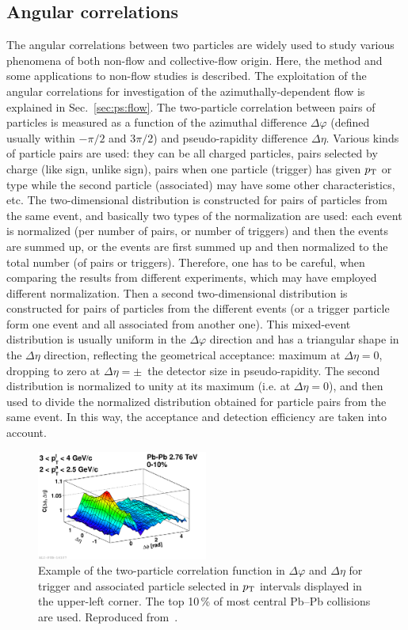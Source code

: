 \subsection{Angular correlations}
\label{subsecks:angular}
The angular correlations between two particles are widely used to study various phenomena of both non-flow and collective-flow origin. Here, the method and some applications to non-flow studies is described. The exploitation of the angular correlations for investigation of the azimuthally-dependent flow is explained in Sec.~\ref{sec:ps:flow}. The two-particle correlation between pairs of particles is measured as a function of the azimuthal difference $\Delta\varphi$ (defined usually within $−\pi/2$ and $3\pi/2$) and pseudo-rapidity difference $\Delta\eta$. Various kinds of particle pairs are used: they can be all charged particles, pairs selected by charge (like sign, unlike sign), pairs when one particle (trigger) has given $p_{\rm T}$ or type while the second particle (associated) may have some other characteristics, etc. The two-dimensional distribution is constructed for pairs of particles from the same event, and basically two types of the normalization are used: each event is normalized (per number of pairs, or number of triggers) and then the events are summed up, or the events are first summed up and then normalized to the total number (of pairs or triggers). Therefore, one has to be careful, when comparing the results from different experiments, which may have employed different normalization. Then a second two-dimensional distribution is constructed for pairs of particles from the different events (or a trigger particle form one event and all associated from another one). This mixed-event distribution is usually uniform in the $\Delta\varphi$ direction and has a triangular shape in the $\Delta\eta$ direction, reflecting the geometrical acceptance: maximum at $\Delta\eta = 0$, dropping to zero at $\Delta\eta = \pm$~the detector size in pseudo-rapidity. The second distribution is normalized to unity at its maximum (i.e. at $\Delta\eta = 0$), and then used to divide the normalized distribution obtained for particle pairs from the same event. In this way, the acceptance and detection efficiency are taken into account.

\begin{figure}
\centering
\includegraphics[width=0.5\textwidth]{ksfigures/TwoParticleCorrFunction.pdf}
\caption{Example of the two-particle correlation function in $\Delta\varphi$ and $\Delta\eta$ for trigger and associated particle selected in $p_{\rm T}$ intervals displayed in the upper-left corner. The top 10\,\% of most central Pb--Pb collisions are used. Reproduced from~\cite{Aamodt:2011by}.}
\label{figks:CorrExamle}
\end{figure}


